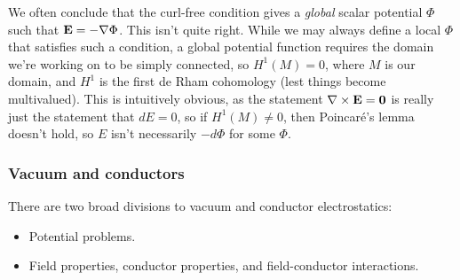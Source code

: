 \documentclass[11pt]{article}
\begin{document}
\begin{reemark}
    [On $\curl \elec = \mathbf{0} \implies \elec = - \grad \Phi$]
    We often conclude that the curl-free condition gives a \emph{global} 
    scalar potential $\Phi$ such that $\mathbf{E} = - \nabla \Phi$. This isn't quite
    right. While we may always define a local $\Phi$ that satisfies such a
    condition, a global potential function requires the domain we're working
    on to be simply connected, so $H^1(M) = 0$, where $M$ is our domain,
    and $H^1$ is the first de Rham cohomology (lest things become multivalued). 
    This is intuitively obvious, as the statement $\nabla \times \mathbf{E} = \mathbf{0}$ is 
    really just the statement that $dE = 0$, so if $H^1(M) \neq 0$, then Poincar\'e's 
    lemma doesn't hold, so $E$ isn't necessarily $- d\Phi$ for some $\Phi$.
\end{reemark}

\subsubsection{Vacuum and conductors}

There are two broad divisions to vacuum and conductor electrostatics:
\begin{itemize}
    \item Potential problems.
    \item Field properties, conductor properties, and field-conductor interactions.
\end{itemize}
\end{document}
